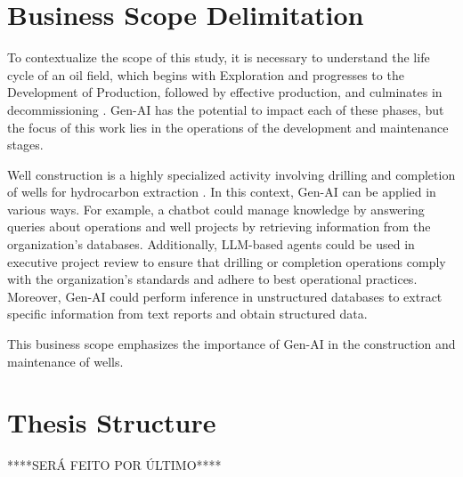 \section{Business Scope Delimitation}

    To contextualize the scope of this study, it is necessary to understand the life cycle of an oil field, which begins with Exploration and progresses to the Development of Production, followed by effective production, and culminates in decommissioning \cite{Badiru2016}. Gen-AI has the potential to impact each of these phases, but the focus of this work lies in the operations of the development and maintenance stages.
            
    Well construction is a highly specialized activity involving drilling and completion of wells for hydrocarbon extraction \cite{Thomas2004}. In this context, Gen-AI can be applied in various ways. For example, a chatbot could manage knowledge by answering queries about operations and well projects by retrieving information from the organization's databases. Additionally, LLM-based agents could be used in executive project review to ensure that drilling or completion operations comply with the organization's standards and adhere to best operational practices. Moreover, Gen-AI could perform inference in unstructured databases to extract specific information from text reports and obtain structured data. 
    
    This business scope emphasizes the importance of Gen-AI in the construction and maintenance of wells.

\section{Thesis Structure}

    ****SERÁ FEITO POR ÚLTIMO****
